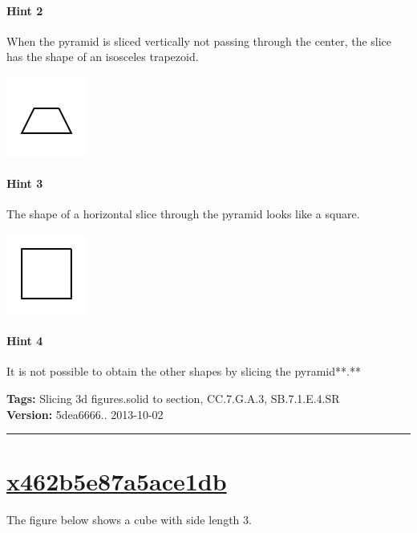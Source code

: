 \documentclass[twocolumn,10pt]{article}
\def\shrinkfactor{0.55}
\begin{document}
\paragraph{Hint 2}When the pyramid is sliced vertically not passing through the center, the slice has the shape of an isosceles trapezoid.   

\includegraphics[scale=\shrinkfactor]{figures/462dbf19e63d9954ed7a531f7ea0e2b0379d9bb9.png}

\paragraph{Hint 3}The shape of a horizontal slice through the pyramid looks like a square.  

\includegraphics[scale=\shrinkfactor]{figures/4b59a0ece6acc7c19c389e1de534d1df93bf1169.png}

\paragraph{Hint 4}It is not possible to obtain the other shapes by slicing the pyramid**.**



\medskip
\noindent
\textbf{Tags:} {\footnotesize Slicing 3d figures.solid to section, CC.7.G.A.3, SB.7.1.E.4.SR}\\
\textbf{Version:} 5dea6666.. 2013-10-02
\smallskip\hrule





\section{\href{https://www.khanacademy.org/devadmin/content/items/x462b5e87a5ace1db}{x462b5e87a5ace1db}}

\noindent
The figure below shows a cube with side length $3$.   
\end{document}
